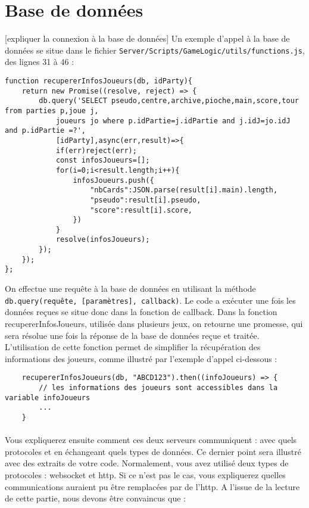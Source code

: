 \documentclass[a4paper]{article}
\begin{document}
\part{Base de données}
[expliquer la connexion à la base de données]
Un exemple d'appel à la base de données se situe dans le fichier \texttt{Server/Scripts/GameLogic/utils/functions.js}, des lignes 31 à 46 :\\
\begin{verbatim}
function recupererInfosJoueurs(db, idParty){
    return new Promise((resolve, reject) => {
        db.query('SELECT pseudo,centre,archive,pioche,main,score,tour from parties p,joue j,
            joueurs jo where p.idPartie=j.idPartie and j.idJ=jo.idJ and p.idPartie =?',
            [idParty],async(err,result)=>{
            if(err)reject(err);
            const infosJoueurs=[];
            for(i=0;i<result.length;i++){
                infosJoueurs.push({
                    "nbCards":JSON.parse(result[i].main).length,
                    "pseudo":result[i].pseudo,
                    "score":result[i].score,
                })
            }
            resolve(infosJoueurs);
        });
    });
};
\end{verbatim}
On effectue une requête à la base de données en utilisant la méthode \texttt{db.query(requête, [paramètres], callback)}. Le code a exécuter une fois les données reçues se situe donc dans la fonction de callback.
Dans la fonction recupererInfosJoueurs, utilisée dans plusieurs jeux, on retourne une promesse, qui sera résolue une fois la réponse de la base de données reçue et traitée.
L'utilisation de cette fonction permet de simplifier la récupération des informations des joueurs, comme illustré par l'exemple d'appel ci-dessous :
\begin{verbatim}
    recupererInfosJoueurs(db, "ABCD123").then((infoJoueurs) => {
        // les informations des joueurs sont accessibles dans la variable infoJoueurs
        ...
    }
\end{verbatim}

\subsection{} 
Vous expliquerez ensuite comment ces deux serveurs communiquent : avec quels 
protocoles et en échangeant quels types de données. Ce dernier point sera illustré 
avec des extraits de votre code. Normalement, vous avez utilisé deux types de 
protocoles : websocket et http. Si ce n’est pas le cas, vous expliquerez quelles 
communications auraient pu être remplacées par de l’http. A l’issue de la lecture de 
cette partie, nous devons être convaincus que :
\end{document}
